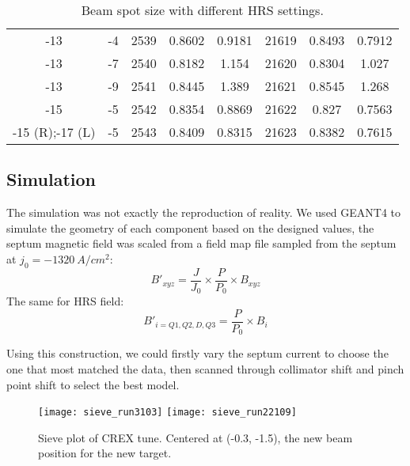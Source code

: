 \begin{table}[h!]
\begin{tabular}{c c | c c c | c c c}
	-13 & -4    & 2539  & 0.8602	& 0.9181    & 21619	& 0.8493    & 0.7912  \\
	-13 & -7    & 2540  & 0.8182	& 1.154	    & 21620	& 0.8304    & 1.027   \\
	-13 & -9    & 2541  & 0.8445	& 1.389	    & 21621	& 0.8545    & 1.268   \\
	-15 & -5    & 2542  & 0.8354	& 0.8869    & 21622	& 0.827	    & 0.7563  \\
	\hline
	-15 (R);-17 (L)	& -5	&2543	& 0.8409	& 0.8315  & 21623 & 0.8382	& 0.7615  \\
	\hline
    \end{tabular}
    \caption{Beam spot size with different HRS settings.}
\end{table}

\subsection{Simulation}
The simulation was not exactly the reproduction of reality. We used GEANT4 to
simulate the geometry of each component based on the designed values, the
septum magnetic field was scaled from a field map file sampled from the septum
at $j_0 = -1320\ A/cm^2$: %
\begin{equation}
    B'_{xyz} = \frac{J}{J_0} \times \frac{P}{P_0} \times B_{xyz}
\end{equation}
The same for HRS field: %
\begin{equation}
    B'_{i = Q1, Q2, D, Q3} = \frac{P}{P_0} \times B_i
\end{equation}

Using this construction, we could firstly vary the septum current to choose the
one that most matched the data, then scanned through collimator shift and pinch point
shift to select the best model.

\begin{figure}[H]
    \texttt{[image: sieve\_run3103]}
    \texttt{[image: sieve\_run22109]}
    \caption{Sieve plot of CREX tune. Centered at (-0.3, -1.5), the new beam 
    position for the new target.}
\end{figure}

